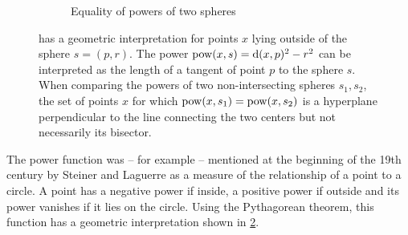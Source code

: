\begin{figure}[tb]
\begin{subfigure}[b]{.55\linewidth}
        \caption{Equality of powers of two spheres}
        \label{sfig:chordal}
    \end{subfigure}
    \caption{ has a geometric interpretation for points $x$ lying outside of the sphere $s=(p, r)$. The power $\operatorname{pow}(x, s) = \operatorname{d}(x, p)^2 - r^2$ can be interpreted as the length of a tangent of point $p$ to the sphere $s$. When comparing the powers of two non-intersecting spheres $s_1, s_2$, the set of points $x$ for which $\operatorname{pow}(x, s_1) = \operatorname{pow}(x, s_2)$ is a hyperplane perpendicular to the line connecting the two centers but not necessarily its bisector.}
    \label{fig:power}
\end{figure}

The power function was -- for example -- mentioned at the beginning of the 19th century by Steiner \cite{steiner1881jacob} and Laguerre \cite{blaschke2013vorlesungen} as a measure of the relationship of a point to a circle.
A point has a negative power if inside, a positive power if outside and its power vanishes if it lies on the circle.
Using the Pythagorean theorem, this function has a geometric interpretation shown in \cref{fig:power}.

